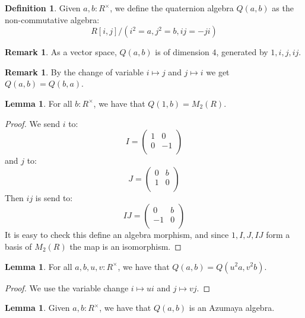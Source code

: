 \documentclass[10pt,a4paper]{article}
\theoremstyle{definition}
\newtheorem{lemma}[theorem]{Lemma}
\newtheorem{definition}[theorem]{Definition}
\newtheorem{remark}[theorem]{Remark}
\begin{document}
\begin{definition}
Given $a,b:R^\times$, we define the quaternion algebra $Q(a,b)$ as the non-commutative algebra:
\[R[i,j]/(i^2=a,j^2=b,ij=-ji)\] 
\end{definition}

\begin{remark}
As a vector space, $Q(a,b)$ is of dimension $4$, generated by $1,i,j,ij$.
\end{remark}

\begin{remark}
By the change of variable $i\mapsto j$ and $j\mapsto i$ we get $Q(a,b) = Q(b,a)$.
\end{remark}

\begin{lemma}\label{quaternion-split}
For all $b:R^\times$, we have that $Q(1,b) = M_2(R)$.
\end{lemma}

\begin{proof}
We send $i$ to:
\[I = \begin{pmatrix}
1 & 0\\
0 & -1\\
\end{pmatrix}\]
and $j$ to:
\[J = \begin{pmatrix}
0 & b\\
1 & 0\\
\end{pmatrix}\]
Then $ij$ is send to:
\[IJ = \begin{pmatrix}
0 & b\\
-1 & 0\\
\end{pmatrix}\]
It is easy to check this define an algebra morphism, and since $1,I,J,IJ$ form a basis of $M_2(R)$ the map is an isomorphism.
\end{proof}

\begin{lemma}\label{quaternion-change-variable}
For all $a,b,u,v:R^\times$, we have that $Q(a,b) = Q(u^2a,v^2b)$.
\end{lemma}

\begin{proof}
We use the variable change $i\mapsto ui$ and $j\mapsto vj$.
\end{proof}

\begin{lemma}
Given $a,b:R^\times$, we have that $Q(a,b)$ is an Azumaya algebra. 
\end{lemma}
\end{document}
